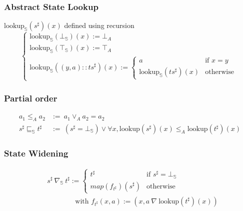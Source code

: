 \documentclass{beamer}
\begin{document}
\begin{frame}
    \frametitle{Abstract State Lookup}
    \( \text{lookup}_\mathbb{S}(s^{\sharp}) (x)\) defined using recursion
    \[
    \begin{cases}
        \text{lookup}_\mathbb{S}(\bot_\mathbb{S})(x) := \bot_A \\  
        \text{lookup}_\mathbb{S}(\top_\mathbb{S})(x) := \top_A \\
        \text{lookup}_\mathbb{S}((y, a) :: {ts}^{\sharp}) (x) := \begin{cases}
            a & \text{if } x = y \\
            \text{lookup}_\mathbb{S}(ts^{\sharp})(x) & \text{otherwise}
            \end{cases} 
        \end{cases}
    \]
\end{frame}























\begin{frame}
    \frametitle{Partial order}
    \begin{align*}
        a_1 \le_A a_2 &:=\ a_1 \vee_A a_2 = a_2 \\
        s^{\sharp} \sqsubseteq_\mathbb{S} t^{\sharp} &:=\ (s^{\sharp} = \bot_\mathbb{S}) \vee \forall x, \text{lookup} (s^{\sharp}) (x) \le_A \text{lookup} (t^{\sharp}) (x)
    \end{align*}
\end{frame}



\begin{frame}
    \frametitle{State Widening}
    \begin{align*} 
        &s^{\sharp}\ \nabla_\mathbb{S}\ t^{\sharp} := \begin{cases}
                                                    t^{\sharp}       & \text{if } s^{\sharp} = \bot_\mathbb{S}\\
                                                    map (f_{t^{\sharp}}) (s^{\sharp}) & \text{otherwise}
                                                    \end{cases} \\
    & \qquad \qquad \text{with } f_{t^{\sharp}}(x, a) := (x, a\ \nabla\ \text{lookup} (t^{\sharp}) (x))
    \end{align*}
\end{frame}
\end{document}
